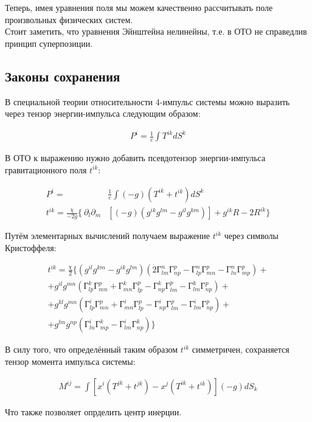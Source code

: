 \documentclass[a4paper,14pt]{article}
\begin{document}
	Теперь, имея уравнения поля мы можем качественно рассчитывать поле произвольных физических систем. \\

	Стоит заметить, что уравнения Эйнштейна нелинейны, т.е. в ОТО не справедлив принцип суперпозиции.

\subsection*{Законы сохранения}

	В специальной теории относительности 4-импульс системы можно выразить через тензор энергии-импульса следующим образом:

	\begin{align*}
		P^i = \frac{1}{c} \int T^{ik} dS^k
	\end{align*}

	В ОТО к выражению нужно добавить псевдотензор энергии-импульса гравитационного поля $t^{ik}$:

	\begin{align*}
		P^i = & \frac{1}{c} \int (-g)(T^{ik} + t^{ik}) dS^k \\
		t^{ik} = \frac{ \chi }{-2g} \{ \: \partial_l \partial_m & [(-g)(g^{ik} g^{lm} - g^{il} g^{km})] + g^{ik} R - 2R^{ik} \}
	\end{align*}

	Путём элементарных вычислений получаем выражение $t^{ik}$ через символы Кристоффеля:

	\begin{align*}
		t^{ik} = \frac{ \chi }{2} \{ ( g^{il} g^{km} - g^{ik} g^{lm} )( 2Г_{lm}^n Г_{np}^p - Г_{lp}^n Г_{mn}^p - Г_{ln}^n Г_{mp}^p ) + \\
		+ g^{il} g^{mn} ( Г_{lp}^k Г_{mn}^p + Г_{mn}^k Г_{lp}^p - Г_{np}^k Г_{lm}^p - Г_{lm}^k Г_{np}^p ) + \\
		+ g^{kl} g^{mn} ( Г_{lp}^i Г_{mn}^p + Г_{mn}^i Г_{lp}^p - Г_{np}^i Г_{lm}^p - Г_{lm}^i Г_{np}^p ) + \\
		+ g^{lm} g^{np} ( Г_{ln}^i Г_{mp}^k - Г_{lm}^i Г_{np}^k ) \}
	\end{align*}

	В силу того, что определённый таким образом $t^{ik}$ симметричен, сохраняется тензор момента импульса системы:

	\begin{align*}
		M^{ij} = \int [ x^i ( T^{jk} + t^{jk} ) - x^j ( T^{ik} + t^{ik} )](-g)dS_k
	\end{align*}

	Что также позволяет опрделить центр инерции.
\end{document}
